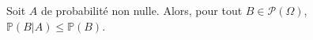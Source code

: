 Soit $A$ de probabilité non nulle. Alors, pour tout $B\in \mathscr P(\Omega)$, $\mathbb{P}(B|A)\leq \mathbb{P}(B)$.

\begin{reponses}
\end{reponses}

